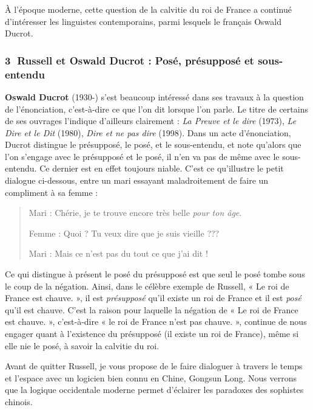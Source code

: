 À l’époque moderne, cette question de la calvitie du roi de France a continué d’intéresser les linguistes contemporains, parmi lesquels le français Oswald Ducrot.

\subsubsection*{\textcircled{\scriptsize 3} Russell et Oswald Ducrot : Posé, présupposé et sous-entendu}
\textbf{Oswald Ducrot} (1930-) s’est beaucoup intéressé dans ses travaux à la question de l’énonciation, c’est-à-dire ce que l’on dit lorsque l’on parle. Le titre de certains de ses ouvrages l’indique d’ailleurs clairement : \textit{La Preuve et le dire} (1973), \textit{Le Dire et le Dit} (1980), \textit{Dire et ne pas dire} (1998). Dans un acte d’énonciation, Ducrot distingue le présupposé, le posé, et le sous-entendu, et note qu’alors que l’on s’engage avec le présupposé et le posé, il n’en va pas de même avec le sous-entendu. Ce dernier est en effet toujours niable. C’est ce qu’illustre le petit dialogue ci-dessous, entre un mari essayant maladroitement de faire un compliment à sa femme :

\begin{quote}
Mari : Chérie, je te trouve encore très belle \textit{pour ton âge}.

Femme : Quoi ? Tu veux dire que je suis vieille ???

Mari : Mais ce n’est pas du tout ce que j’ai dit !
\end{quote}

Ce qui distingue à présent le posé du présupposé est que seul le posé tombe sous le coup de la négation. Ainsi, dans le célèbre exemple de Russell, « Le roi de France est chauve. », il est \textit{présupposé} qu’il existe un roi de France et il est \textit{posé} qu’il est chauve. C’est la raison pour laquelle la négation de « Le roi de France est chauve. », c’est-à-dire « le roi de France n’est pas chauve. », continue de nous engager quant à l’existence du présupposé (il existe un roi de France), même si elle nie le posé, à savoir la calvitie du roi.

Avant de quitter Russell, je vous propose de le faire dialoguer à travers le temps et l’espace avec un logicien bien connu en Chine, Gongsun Long. Nous verrons que la logique occidentale moderne permet d’éclairer les paradoxes des sophistes chinois.

